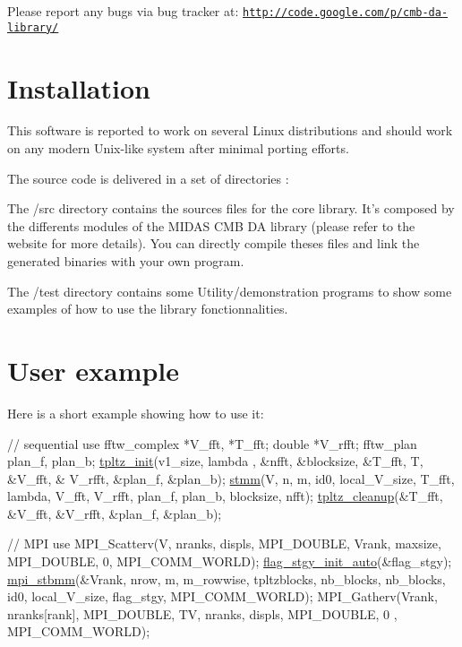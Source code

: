 Please report any bugs via bug tracker at\-: \href{http://code.google.com/p/cmb-da-library/}{\tt http\-://code.\-google.\-com/p/cmb-\/da-\/library/} \hypertarget{toeplitz_install}{}\section{Installation}\label{toeplitz_install}
This software is reported to work on several Linux distributions and should work on any modern Unix-\/like system after minimal porting efforts.

The source code is delivered in a set of directories \-:


\begin{DoxyItemize}
\item The /src directory contains the sources files for the core library. It's composed by the differents modules of the M\-I\-D\-A\-S C\-M\-B D\-A library (please refer to the website for more details). You can directly compile theses files and link the generated binaries with your own program.
\end{DoxyItemize}


\begin{DoxyItemize}
\item The /test directory contains some Utility/demonstration programs to show some examples of how to use the library fonctionnalities. 
\end{DoxyItemize}\hypertarget{toeplitz_example}{}\section{User example}\label{toeplitz_example}
Here is a short example showing how to use it\-: 
\begin{DoxyCode}
 \textcolor{comment}{// sequential use}
 fftw\_complex *V\_fft, *T\_fft;
 \textcolor{keywordtype}{double} *V\_rfft;
 fftw\_plan plan\_f, plan\_b;
 \hyperlink{group__group11_ga7f4e77d71f2c6f2caf652bab7520e3f4}{tpltz\_init}(v1\_size, lambda , &nfft, &blocksize, &T\_fft, T, &V\_fft, &
      V\_rfft, &plan\_f, &plan\_b);
 \hyperlink{group__group11_gab2face64bf4e429b38b3ae1a6701cc78}{stmm}(V, n, m, id0, local\_V\_size, T\_fft, lambda, V\_fft, V\_rfft, plan\_f, 
      plan\_b, blocksize, nfft);
 \hyperlink{group__group11_gac7ac0ee5f6eaee6846814b131671f6e8}{tpltz\_cleanup}(&T\_fft, &V\_fft, &V\_rfft, &plan\_f, &plan\_b);
\end{DoxyCode}
 
\begin{DoxyCode}
 \textcolor{comment}{// MPI use}
 MPI\_Scatterv(V, nranks, displs, MPI\_DOUBLE, Vrank, maxsize, MPI\_DOUBLE, 0, 
      MPI\_COMM\_WORLD); 
 \hyperlink{group__group21_ga234bcc963a99bea09ed92b36c711c3ec}{flag\_stgy\_init\_auto}(&flag\_stgy);
 \hyperlink{group__group22_gaa7ea4ac654fcb9f5fe3bad139febb65d}{mpi\_stbmm}(&Vrank, nrow, m, m\_rowwise, tpltzblocks, nb\_blocks, 
      nb\_blocks, id0, local\_V\_size, flag\_stgy, MPI\_COMM\_WORLD);
 MPI\_Gatherv(Vrank, nranks[rank], MPI\_DOUBLE, TV, nranks, displs, MPI\_DOUBLE, 0
      , MPI\_COMM\_WORLD);
\end{DoxyCode}
 
